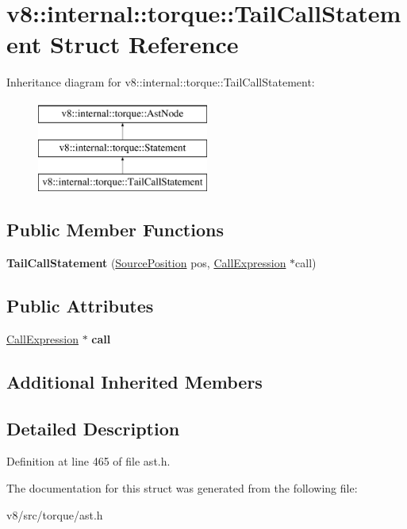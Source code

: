 \hypertarget{structv8_1_1internal_1_1torque_1_1TailCallStatement}{}\section{v8\+:\+:internal\+:\+:torque\+:\+:Tail\+Call\+Statement Struct Reference}
\label{structv8_1_1internal_1_1torque_1_1TailCallStatement}
Inheritance diagram for v8\+:\+:internal\+:\+:torque\+:\+:Tail\+Call\+Statement\+:\begin{figure}[H]
\begin{center}
\leavevmode
\includegraphics[height=3.000000cm]{structv8_1_1internal_1_1torque_1_1TailCallStatement}
\end{center}
\end{figure}
\subsection*{Public Member Functions}
\begin{DoxyCompactItemize}
\item 
\mbox{\label{structv8_1_1internal_1_1torque_1_1TailCallStatement_a98c52eddb2bde568433a3b1b9f6dfd16}} 
{\bfseries Tail\+Call\+Statement} (\mbox{\hyperlink{structv8_1_1internal_1_1torque_1_1SourcePosition}{Source\+Position}} pos, \mbox{\hyperlink{structv8_1_1internal_1_1torque_1_1CallExpression}{Call\+Expression}} $\ast$call)
\end{DoxyCompactItemize}
\subsection*{Public Attributes}
\begin{DoxyCompactItemize}
\item 
\mbox{\label{structv8_1_1internal_1_1torque_1_1TailCallStatement_a937d9e1bfbb419d5e6034dbfeb24e796}} 
\mbox{\hyperlink{structv8_1_1internal_1_1torque_1_1CallExpression}{Call\+Expression}} $\ast$ {\bfseries call}
\end{DoxyCompactItemize}
\subsection*{Additional Inherited Members}


\subsection{Detailed Description}


Definition at line 465 of file ast.\+h.



The documentation for this struct was generated from the following file\+:\begin{DoxyCompactItemize}
\item 
v8/src/torque/ast.\+h\end{DoxyCompactItemize}
